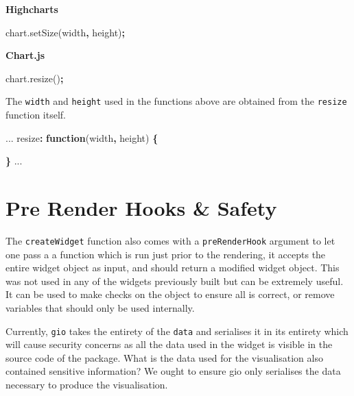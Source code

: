 \documentclass[
]{krantz}
\makeatletter
\newenvironment{Shaded}{\begin{snugshade}}{\end{snugshade}}
\newcommand{\AttributeTok}[1]{\textcolor[rgb]{0.61,0.61,0.61}{#1}}
\newcommand{\KeywordTok}[1]{\textcolor[rgb]{0.27,0.27,0.27}{\textbf{#1}}}
\newcommand{\NormalTok}[1]{#1}
\newcommand{\OperatorTok}[1]{\textcolor[rgb]{0.43,0.43,0.43}{\textbf{#1}}}
\newcommand{\VariableTok}[1]{\textcolor[rgb]{0,0,0}{#1}}
\newenvironment{kframe}{%
\medskip{}
\setlength{\fboxsep}{.8em}
 \def\at@end@of@kframe{}%
 \ifinner\ifhmode%
  \def\at@end@of@kframe{\end{minipage}}%
  \begin{minipage}{\columnwidth}%
 \fi\fi%
 \def\FrameCommand##1{\hskip\@totalleftmargin \hskip-\fboxsep
 \colorbox{shadecolor}{##1}\hskip-\fboxsep
     \hskip-\linewidth \hskip-\@totalleftmargin \hskip\columnwidth}%
 \MakeFramed {\advance\hsize-\width
   \@totalleftmargin\z@ \linewidth\hsize
   \@setminipage}}%
 {\par\unskip\endMakeFramed%
 \at@end@of@kframe}
\renewenvironment{Shaded}{\begin{kframe}}{\end{kframe}}
\makeatother
\begin{document}
\textbf{Highcharts}

\begin{Shaded}
\begin{Highlighting}[]
\VariableTok{chart}\NormalTok{.}\AttributeTok{setSize}\NormalTok{(width}\OperatorTok{,}\NormalTok{ height)}\OperatorTok{;}
\end{Highlighting}
\end{Shaded}

\textbf{Chart.js}

\begin{Shaded}
\begin{Highlighting}[]
\VariableTok{chart}\NormalTok{.}\AttributeTok{resize}\NormalTok{()}\OperatorTok{;}
\end{Highlighting}
\end{Shaded}

The \texttt{width} and \texttt{height} used in the functions above are obtained from the \texttt{resize} function itself.

\begin{Shaded}
\begin{Highlighting}[]
\NormalTok{...}
\NormalTok{resize}\OperatorTok{:} \KeywordTok{function}\NormalTok{(width}\OperatorTok{,}\NormalTok{ height) }\OperatorTok{\{}
  
\OperatorTok{\}}
\NormalTok{...}
\end{Highlighting}
\end{Shaded}

\hypertarget{pre-render-hooks-safety}{%
\section{Pre Render Hooks \& Safety}\label{pre-render-hooks-safety}}

The \texttt{createWidget} function also comes with a \texttt{preRenderHook} argument to let one pass a a function which is run just prior to the rendering, it accepts the entire widget object as input, and should return a modified widget object. This was not used in any of the widgets previously built but can be extremely useful. It can be used to make checks on the object to ensure all is correct, or remove variables that should only be used internally.

Currently, \texttt{gio} takes the entirety of the \texttt{data} and serialises it in its entirety which will cause security concerns as all the data used in the widget is visible in the source code of the package. What is the data used for the visualisation also contained sensitive information? We ought to ensure gio only serialises the data necessary to produce the visualisation.
\end{document}
